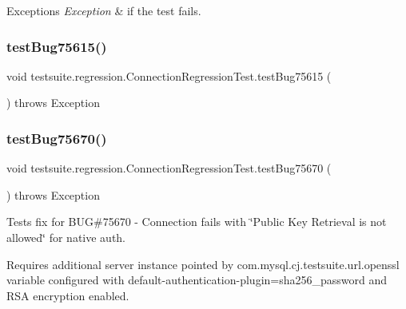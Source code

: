 \begin{DoxyExceptions}{Exceptions}
{\em Exception} & if the test fails. \\
\hline
\end{DoxyExceptions}
\mbox{\label{classtestsuite_1_1regression_1_1_connection_regression_test_a7f267194efdf847a2f291c1831abcde6}} 
\subsubsection{\texorpdfstring{test\+Bug75615()}{testBug75615()}}
{\footnotesize\ttfamily void testsuite.\+regression.\+Connection\+Regression\+Test.\+test\+Bug75615 (\begin{DoxyParamCaption}{ }\end{DoxyParamCaption}) throws Exception}

\mbox{\label{classtestsuite_1_1regression_1_1_connection_regression_test_ae51a7e49df56ea469720a9d165fc124a}} 
\subsubsection{\texorpdfstring{test\+Bug75670()}{testBug75670()}}
{\footnotesize\ttfamily void testsuite.\+regression.\+Connection\+Regression\+Test.\+test\+Bug75670 (\begin{DoxyParamCaption}{ }\end{DoxyParamCaption}) throws Exception}

Tests fix for B\+UG\#75670 -\/ Connection fails with \char`\"{}\+Public Key Retrieval is not allowed\char`\"{} for native auth.

Requires additional server instance pointed by com.\+mysql.\+cj.\+testsuite.\+url.\+openssl variable configured with default-\/authentication-\/plugin=sha256\+\_\+password and R\+SA encryption enabled.


